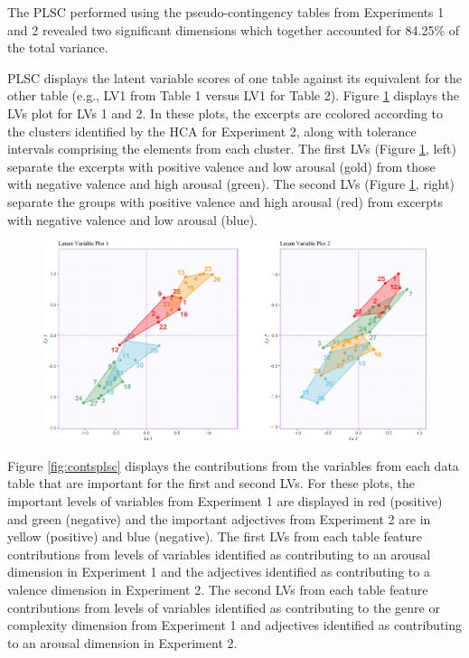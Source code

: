 \documentclass[
  english,
  man,floatsintext]{apa6}
\begin{document}
The PLSC performed using the pseudo-contingency tables from Experiments 1 and 2 revealed two significant dimensions which together accounted for 84.25\% of the total variance.

PLSC displays the latent variable scores of one table against its equivalent for the other table (e.g., LV1 from Table 1 versus LV1 for Table 2). Figure \ref{fig:factorplotsPLSC} displays the LVs plot for LVs 1 and 2. In these plots, the excerpts are ccolored according to the clusters identified by the HCA for Experiment 2, along with tolerance intervals comprising the elements from each cluster. The first LVs (Figure \ref{fig:factorplotsPLSC}, left) separate the excerpts with positive valence and low arousal (gold) from those with negative valence and high arousal (green). The second LVs (Figure \ref{fig:factorplotsPLSC}, right) separate the groups with positive valence and high arousal (red) from excerpts with negative valence and low arousal (blue).

\begin{figure}   
  \centering  
  \caption{PLSC: Latent variables for Experiment 1 contingency table (horizontal) plotted against latent variables for Experiment 2 contingency table (vertical), including tolerance intervals, colored according to the groups revealed by Experiment 2.}
  \label{fig:factorplotsPLSC}
    \includegraphics{./Music-Descriptor-Space_files/figure-latex/factorplotsPLSCcode-1.png}
  \caption*{}
\end{figure}

Figure \ref{fig:contsplsc} displays the contributions from the variables from each data table that are important for the first and second LVs. For these plots, the important levels of variables from Experiment 1 are displayed in red (positive) and green (negative) and the important adjectives from Experiment 2 are in yellow (positive) and blue (negative). The first LVs from each table feature contributions from levels of variables identified as contributing to an arousal dimension in Experiment 1 and the adjectives identified as contributing to a valence dimension in Experiment 2. The second LVs from each table feature contributions from levels of variables identified as contributing to the genre or complexity dimension from Experiment 1 and adjectives identified as contributing to an arousal dimension in Experiment 2.
\end{document}
